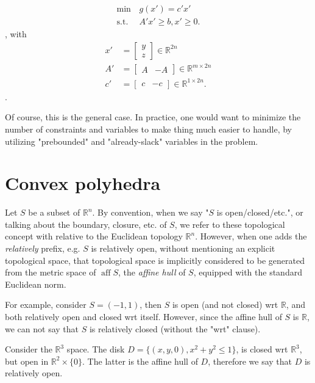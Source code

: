 \begin{align*}
  \min\,&g(x') = c'x'\\
  \text{s.t.}\,& A'x' \ge  b, x' \ge  0
.\end{align*}, with 
\begin{align*}
  x' &= \begin{bmatrix} y \\ z \end{bmatrix} \in \mathbb{R}^{2n}\\
  A' & = \begin{bmatrix} A & -A \end{bmatrix} \in \mathbb{R}^{m \times  2n}\\
  c' &= \begin{bmatrix} c & -c \end{bmatrix} \in \mathbb{R}^{1 \times  2n} 
.\end{align*}.

Of course, this is the general case. In practice, one would want to minimize the
number of constraints and variables to make thing much easier to handle, by
utilizing "prebounded" and "already-slack" variables in the problem.

\section{Convex polyhedra} %
\label{sec:Convex polyhedra}

Let \( S \) be a subset of \( \mathbb{R}^{n} \). By convention, when we say "\(
S\) is open/closed/etc.", or talking about the boundary, closure, etc. of \( S
\), we refer to these topological concept with relative to the Euclidean
topology \( \mathbb{R}^{n} \). However, when one adds the \textit{relatively}
prefix, e.g. \( S \) is relatively open, without mentioning an explicit
topological space, that topological space is implicitly considered to be
generated from the metric space of \( \operatorname{aff} S  \), the
\textit{affine hull} of \( S \), equipped with the standard Euclidean norm.

For example, consider \( S = (-1, 1) \), then \( S \) is open (and not closed)
wrt \( \mathbb{R}
\), and both relatively open and closed wrt itself. However, since the affine
hull of \( S \) is \( \mathbb{R} \), we can not say that \( S \) is relatively
closed (without the "wrt" clause).

Consider the \( \mathbb{R}^3  \) space. The disk \( D = \{(x, y, 0), x^2+y^2\le
1\}   \), is closed wrt \( \mathbb{R}^3  \), but open in \( \mathbb{R}^2\times
\{0\}   \). The latter is the affine hull of \( D \), therefore we say that \( D
\) is relatively open.

